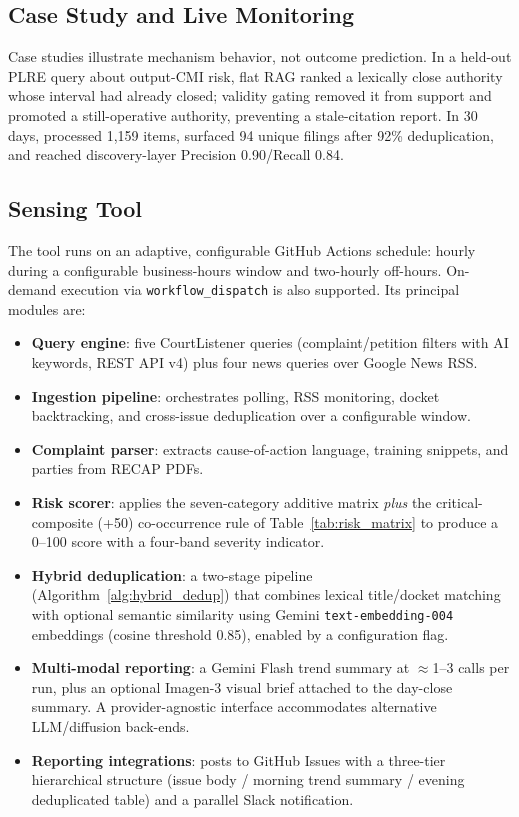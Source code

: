 \subsection{Case Study and Live Monitoring}

Case studies illustrate mechanism behavior, not outcome prediction. In a held-out PLRE query about output-CMI risk, flat RAG ranked a lexically close authority whose interval had already closed; validity gating removed it from support and promoted a still-operative authority, preventing a stale-citation report. In 30 days, \trackername{} processed 1{,}159 items, surfaced 94 unique filings after 92\% deduplication, and reached discovery-layer Precision 0.90/Recall 0.84.

\subsection{Sensing Tool}


The \trackername{} tool runs on an adaptive, configurable GitHub Actions schedule: hourly during a configurable business-hours window and two-hourly off-hours. On-demand execution via \texttt{workflow\_dispatch} is also supported. Its principal modules are:

\begin{itemize}
  \item \textbf{Query engine}: five CourtListener queries (complaint/petition filters with AI keywords, REST API v4) plus four news queries over Google News RSS.
  \item \textbf{Ingestion pipeline}: orchestrates polling, RSS monitoring, docket backtracking, and cross-issue deduplication over a configurable window.
  \item \textbf{Complaint parser}: extracts cause-of-action language, training snippets, and parties from RECAP PDFs.
  \item \textbf{Risk scorer}: applies the seven-category additive matrix \emph{plus} the critical-composite (+50) co-occurrence rule of Table~\ref{tab:risk_matrix} to produce a 0--100 score with a four-band severity indicator.
  \item \textbf{Hybrid deduplication}: a two-stage pipeline (Algorithm~\ref{alg:hybrid_dedup}) that combines lexical title/docket matching with optional semantic similarity using Gemini \texttt{text-embedding-004} embeddings (cosine threshold 0.85), enabled by a configuration flag.
  \item \textbf{Multi-modal reporting}: a Gemini Flash trend summary at $\approx$1--3 calls per run, plus an optional Imagen-3 visual brief attached to the day-close summary. A provider-agnostic interface accommodates alternative LLM/diffusion back-ends.
  \item \textbf{Reporting integrations}: posts to GitHub Issues with a three-tier hierarchical structure (issue body / morning trend summary / evening deduplicated table) and a parallel Slack notification.
\end{itemize}


